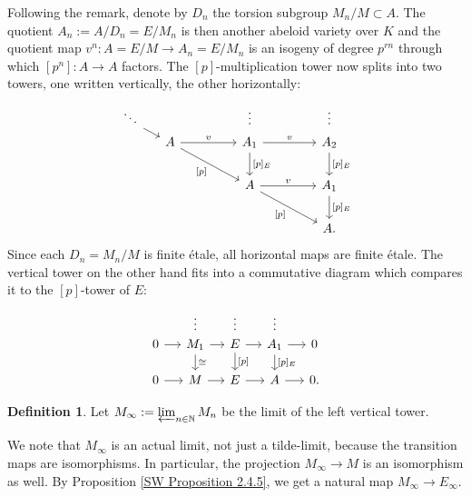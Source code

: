 \documentclass[10pt,oneside]{amsart}
\theoremstyle{definition}
\newtheorem{definition}[theorem]{Definition}
\newcommand{\N}{\mathbb{N}}
\begin{document}
	Following the remark, denote by $D_n$ the torsion subgroup $M_n/M\subset A$. The quotient $A_n:=A/D_n = E/M_n$ is then another abeloid variety over $K$ and the quotient map $v^n\colon A=E/M\rightarrow A_n=E/M_n$ is an isogeny of degree $p^{rn}$  through which  $[p^n]\colon A\rightarrow A$ factors. The $[p]$-multiplication tower now splits into two towers, one written vertically, the other horizontally:
		\begin{equation}\label{p-multiplication tower of E/M splits into vertical and horizontal tower}
		\begin{tikzcd}[column sep={1.1cm,between origins},row sep={0.6cm,between origins}]
			\ddots \arrow[rd] &  &  & \vdots &  & \vdots \\
			& A \arrow[rr,"v"] \arrow[rrdd, "{[p]}"'] &  & A_1 \arrow[rr,"v"] \arrow[dd,"{[p]_E}"] &  & A_2 \arrow[dd,"{[p]_E}"] \\
			&  &  &  &  &  \\
			&  &  & A \arrow[rrdd, "{[p]}"'] \arrow[rr,"v"] &  & A_1 \arrow[dd,"{[p]_E}"] \\
			&  &  &  &  &  \\
			&  &  &  &  & A.
		\end{tikzcd}
		\end{equation}
		Since each $D_n=M_n/M$ is finite \'etale, all horizontal maps are finite \'etale. The vertical tower on the other hand fits into a commutative diagram which compares it to the $[p]$-tower of $E$:
		\begin{equation}\label{F-tower for E/M}
		\begin{tikzcd}[column sep={1.1cm,between origins},row sep={0.5cm,between origins}]
			&\vdots&\vdots&\vdots&\\
			0 \arrow[r] & M_1 \arrow[dd, "\cong"] \arrow[r] & E \arrow[dd, "{[p]}"] \arrow[r] & A_1 \arrow[dd, "{[p]_E}"] \arrow[r] & 0 \\
			\\
			0 \arrow[r] & M \arrow[r] & E \arrow[r] & A \arrow[r] & 0.
		\end{tikzcd}
		\end{equation}
		\begin{definition}
			Let $M_\infty:=\varprojlim_{n\in\N} M_n$ be the limit of the left vertical tower. 
		\end{definition}
		We note that $M_\infty$ is an actual limit, not just a tilde-limit, because the transition maps are isomorphisms. In particular, the projection $M_\infty\to M$ is an isomorphism as well. 
		By Proposition \ref{SW Proposition 2.4.5}, we get a natural map $M_\infty\to E_\infty$. 
\end{document}
